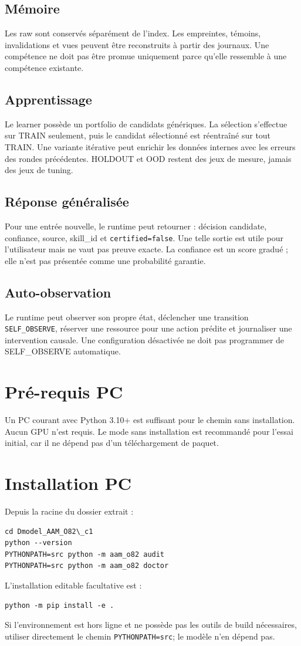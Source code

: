 \documentclass[11pt,a4paper]{report}
\begin{document}
\section{Mémoire}
Les raw sont conservés séparément de l'index. Les empreintes, témoins, invalidations et vues peuvent être reconstruits à partir des journaux. Une compétence ne doit pas être promue uniquement parce qu'elle ressemble à une compétence existante.

\section{Apprentissage}
Le learner possède un portfolio de candidats génériques. La sélection s'effectue sur TRAIN seulement, puis le candidat sélectionné est réentraîné sur tout TRAIN. Une variante itérative peut enrichir les données internes avec les erreurs des rondes précédentes. HOLDOUT et OOD restent des jeux de mesure, jamais des jeux de tuning.

\section{Réponse généralisée}
Pour une entrée nouvelle, le runtime peut retourner : décision candidate, confiance, source, skill\_id et \texttt{certified=false}. Une telle sortie est utile pour l'utilisateur mais ne vaut pas preuve exacte. La confiance est un score gradué ; elle n'est pas présentée comme une probabilité garantie.

\section{Auto-observation}
Le runtime peut observer son propre état, déclencher une transition \texttt{SELF\_OBSERVE}, réserver une ressource pour une action prédite et journaliser une intervention causale. Une configuration désactivée ne doit pas programmer de SELF\_OBSERVE automatique.

\chapter{Pré-requis PC}
Un PC courant avec Python 3.10+ est suffisant pour le chemin sans installation. Aucun GPU n'est requis. Le mode sans installation est recommandé pour l'essai initial, car il ne dépend pas d'un téléchargement de paquet.

\chapter{Installation PC}
Depuis la racine du dossier extrait :
\begin{verbatim}
cd Dmodel_AAM_O82\_c1
python --version
PYTHONPATH=src python -m aam_o82 audit
PYTHONPATH=src python -m aam_o82 doctor
\end{verbatim}
L'installation editable facultative est :
\begin{verbatim}
python -m pip install -e .
\end{verbatim}
Si l'environnement est hors ligne et ne possède pas les outils de build nécessaires, utiliser directement le chemin \texttt{PYTHONPATH=src}; le modèle n'en dépend pas.
\end{document}

